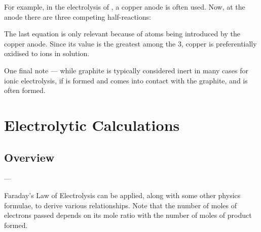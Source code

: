 				For example, in the electrolysis of , a copper anode is often used. Now, at the anode there are three
				competing half-reactions:





				The last equation is only relevant because of  atoms being introduced by the copper anode. Since its \Eox{} value is the
				greatest among the 3, copper is preferentially oxidised to  ions in solution.

				One final note --- while graphite is typically considered inert in many cases for ionic electrolysis, if  is formed and
				comes into contact with the graphite,  and  is often formed.








	\section{Electrolytic Calculations}

		\subsection{Overview}


			--- 

			Faraday's Law of Electrolysis can be applied, along with some other physics formulae, to derive various relationships. Note
			that the number of moles of electrons passed depends on its mole ratio with the number of moles of product formed.

